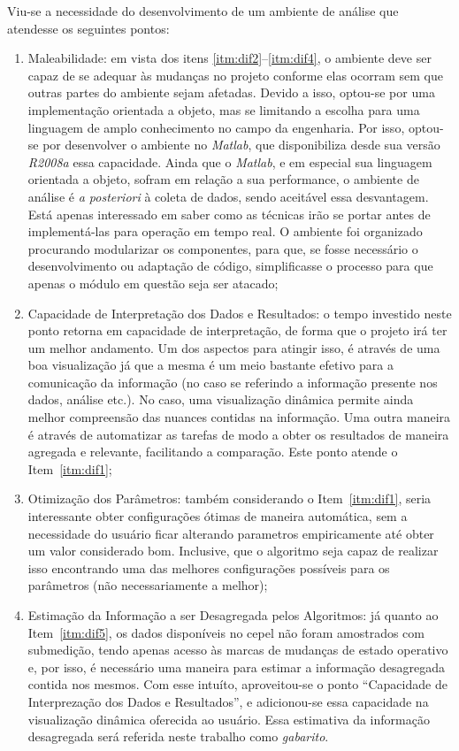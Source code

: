 Viu-se a necessidade do
desenvolvimento de um ambiente de análise que atendesse os seguintes
pontos:

\begin{enumerate}
\item Maleabilidade: em vista dos itens
\ref{itm:dif2}--\ref{itm:dif4}, o ambiente deve ser capaz de se
adequar às mudanças no projeto conforme elas ocorram sem que outras
partes do ambiente sejam afetadas. Devido a isso, optou-se por uma
implementação orientada a objeto, mas se limitando a escolha para uma
linguagem de amplo conhecimento no campo da engenharia. Por isso,
optou-se por desenvolver o ambiente no \emph{Matlab}, que
disponibiliza desde sua versão \emph{R2008a} essa capacidade.
Ainda que o \emph{Matlab}, e em especial sua linguagem orientada a
objeto, sofram em relação a sua performance, o ambiente de análise é
\emph{a posteriori} à coleta de dados, sendo aceitável essa
desvantagem. Está apenas interessado em saber como as técnicas irão se
portar antes de implementá-las para operação em tempo real. O ambiente
foi organizado procurando modularizar os componentes, para que, se
fosse necessário o desenvolvimento ou adaptação de código,
simplificasse o processo para que apenas o módulo em questão seja ser
atacado;

\item Capacidade de Interpretação dos Dados e Resultados: o tempo
investido neste ponto retorna em capacidade de interpretação, de forma
que o projeto irá ter um melhor andamento. Um dos aspectos para
atingir isso, é através de uma boa visualização \cite{it_depends} já
que a mesma é um meio bastante efetivo para a comunicação da
informação (no caso se referindo a informação presente nos dados,
análise etc.). No caso, uma visualização dinâmica permite ainda melhor
compreensão das nuances contidas na informação. Uma outra maneira é
através de automatizar as tarefas de modo a obter os resultados de
maneira agregada e relevante, facilitando a comparação. Este ponto
atende o Item~\ref{itm:dif1};

\item Otimização dos Parâmetros: também considerando o
Item~\ref{itm:dif1}, seria interessante obter configurações ótimas de
maneira automática, sem a necessidade do usuário ficar alterando
parametros empiricamente até obter um valor considerado bom.
Inclusive, que o algoritmo seja capaz de realizar isso encontrando uma
das melhores configurações possíveis para os parâmetros (não
necessariamente a melhor);

\item Estimação da Informação a ser Desagregada pelos Algoritmos: já
quanto ao Item~\ref{itm:dif5}, os dados disponíveis no \acs{cepel} não
foram amostrados com submedição, tendo apenas acesso às marcas de
mudanças de estado operativo e, por isso, é necessário uma maneira para
estimar a informação desagregada contida nos mesmos. Com esse intuíto,
aproveitou-se o ponto ``Capacidade de Interprezação dos Dados e
Resultados'', e adicionou-se essa capacidade na
visualização dinâmica oferecida ao usuário. Essa estimativa da
informação desagregada será referida neste trabalho como
\emph{gabarito}.

\end{enumerate}

